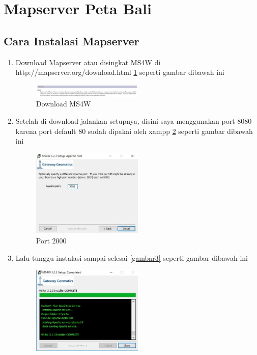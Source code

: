 \section{Mapserver Peta Bali}
\subsection{Cara Instalasi Mapserver}
\begin{enumerate}
\item
Download Mapserver atau disingkat MS4W di http://mapserver.org/download.html \ref{gambar1} seperti gambar dibawah ini
\begin{figure}[ht]
	    \centerline{\includegraphics[width=0.50\textwidth]{figures/gambar1.JPG}}
	    \caption{Download MS4W}
		\label{gambar1}
		\end{figure}
\item
Setelah di download jalankan setupnya, disini saya menggunakan port 8080 karena port default 80 sudah dipakai oleh xampp \ref{gambar2} seperti gambar dibawah ini
\begin{figure}[ht]
	    \centerline{\includegraphics[width=0.50\textwidth]{figures/gambar2.JPG}}
	    \caption{Port 2000}
		\label{gambar2}
		\end{figure}
\item
Lalu tunggu instalasi sampai selesai \ref{gambar3} seperti gambar dibawah ini
\begin{figure}[ht]
	    \centerline{\includegraphics[width=0.50\textwidth]{figures/gambar3.JPG}}

\end{figure}
\end{enumerate}
